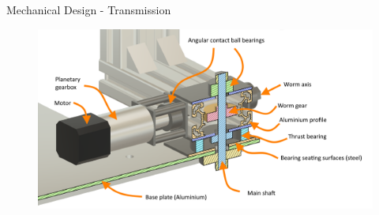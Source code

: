 \documentclass[11pt, aspectratio=169]{beamer}
\begin{document}
\begin{frame}[c]{Mechanical Design - Transmission}
    \begin{figure}
        \includegraphics[height=1\textheight]{mechanical/mech_transmission.png}
    \end{figure}
\end{frame}
\end{document}
